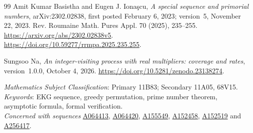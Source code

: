 \documentclass[11pt]{article}
\theoremstyle{remark}
\begin{document}
\begin{thebibliography}{99}
Amit Kumar Basistha and Eugen J. Iona\c{s}cu,
\emph{A special sequence and primorial numbers},
arXiv:2302.02838, first posted February 6, 2023; version~5, November 22, 2023.
Rev. Roumaine Math. Pures Appl. 70 (2025), 235--255.
\url{https://arxiv.org/abs/2302.02838v5}.
\url{https://doi.org/10.59277/rrmpa.2025.235.255}.

Sungsoo Na,
\emph{An integer-visiting process with real multipliers: coverage and rates},
version~1.0.0, October 4, 2026.
\url{https://doi.org/10.5281/zenodo.23138274}.

\end{thebibliography}

\bigskip
{} \emph{Mathematics Subject Classification}:
Primary 11B83; Secondary 11A05, 68V15.\\
\emph{Keywords}: EKG sequence, greedy permutation, prime number theorem,
asymptotic formula, formal verification.\\
\emph{Concerned with sequences}
\href{https://oeis.org/A064413}{A064413},
\href{https://oeis.org/A064420}{A064420},
\href{https://oeis.org/A155549}{A155549},
\href{https://oeis.org/A152458}{A152458},
\href{https://oeis.org/A152519}{A152519} and
\href{https://oeis.org/A256417}{A256417}.
\end{document}
